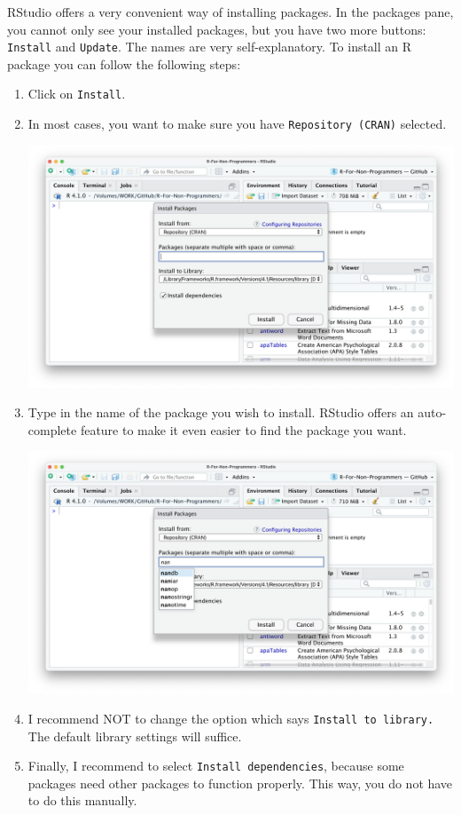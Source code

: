 \documentclass[
]{book}
\begin{document}
RStudio offers a very convenient way of installing packages. In the packages pane, you cannot only see your installed packages, but you have two more buttons: \texttt{Install} and \texttt{Update}. The names are very self-explanatory. To install an R package you can follow the following steps:

\begin{enumerate}
\def\labelenumi{\arabic{enumi}.}
\item
  Click on \texttt{Install}.
\item
  In most cases, you want to make sure you have \texttt{Repository\ (CRAN)} selected.

  \includegraphics{images/chapter_05_img/install_r_packages/01_install_r_packages.png}
\item
  Type in the name of the package you wish to install. RStudio offers an auto-complete feature to make it even easier to find the package you want.

  \includegraphics{images/chapter_05_img/install_r_packages/02_install_r_packages.png}
\item
  I recommend NOT to change the option which says \texttt{Install\ to\ library.} The default library settings will suffice.
\item
  Finally, I recommend to select \texttt{Install\ dependencies}, because some packages need other packages to function properly. This way, you do not have to do this manually.


\end{enumerate}
\end{document}
